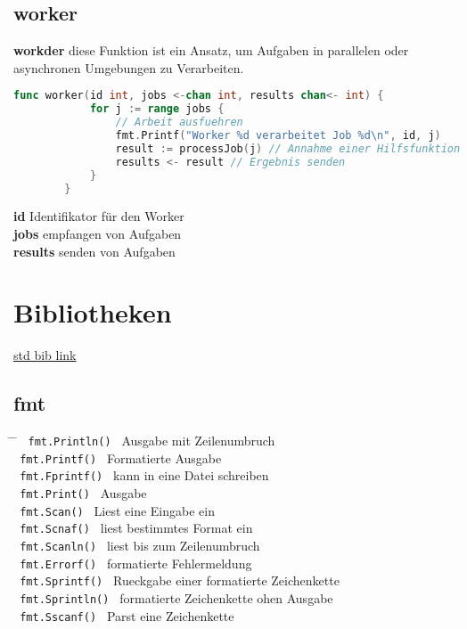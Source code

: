 \documentclass[twoside,a4paper,12pt]{article}
\begin{document}
\subsection{worker}
\textbf{workder} diese Funktion ist ein Ansatz, um Aufgaben in parallelen oder \\
asynchronen Umgebungen zu Verarbeiten. \\
\begin{center}
  \begin{minipage}{1.0\textwidth}
    \begin{lstlisting}[language=Go]
		func worker(id int, jobs <-chan int, results chan<- int) {
		    for j := range jobs {
		        // Arbeit ausfuehren
		        fmt.Printf("Worker %d verarbeitet Job %d\n", id, j)
		        result := processJob(j) // Annahme einer Hilfsfunktion
		        results <- result // Ergebnis senden
		    }
		}
    \end{lstlisting}
  \end{minipage}
\end{center}
\textbf{id} Identifikator für den Worker \\ 
\textbf{jobs} empfangen von Aufgaben \\ 
\textbf{results} senden von Aufgaben \\ 

\section{Bibliotheken}
\href{https://pkg.go.dev/std}{std bib link}
\label{link:pkg}

\subsection{fmt}
\begin{tabbing}
 \hspace{2mm} \= \hspace{50mm} \= \kill
 \> \verb| fmt.Println() | \> Ausgabe mit Zeilenumbruch \\ 
 \> \verb| fmt.Printf() | \> Formatierte Ausgabe \\
 \> \verb| fmt.Fprintf() | \> kann in eine Datei schreiben \\ 
 \> \verb| fmt.Print() | \> Ausgabe \\ 
 \> \verb| fmt.Scan() | \> Liest eine Eingabe ein \\ 
 \> \verb| fmt.Scnaf() | \> liest bestimmtes Format ein \\ 
 \> \verb| fmt.Scanln() | \> liest bis zum Zeilenumbruch \\ 
 \> \verb| fmt.Errorf() | \> formatierte Fehlermeldung \\ 
 \> \verb| fmt.Sprintf() | \> Rueckgabe einer formatierte Zeichenkette \\ 
 \> \verb| fmt.Sprintln() | \> formatierte Zeichenkette ohen Ausgabe \\ 
 \> \verb| fmt.Sscanf() | \> Parst eine Zeichenkette \\ 
\end{tabbing}
\end{document}
